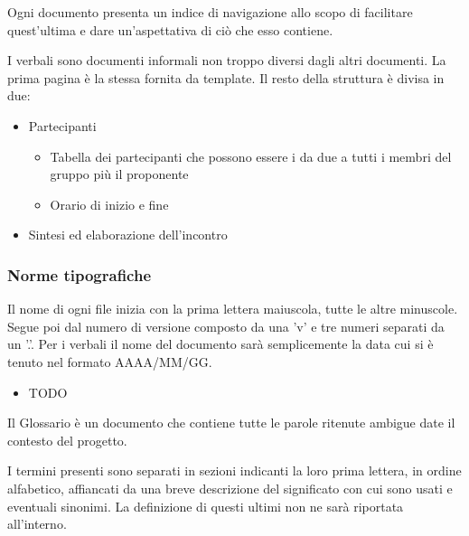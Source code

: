         Ogni documento presenta un indice di navigazione allo scopo di facilitare quest'ultima e
        dare un'aspettativa di ciò che esso contiene.


        I verbali sono documenti informali non troppo diversi dagli altri documenti.
        La prima pagina è la stessa fornita da template.
        Il resto della struttura è divisa in due:
        \begin{itemize}
          \item Partecipanti
          \begin{itemize}
            \item Tabella dei partecipanti che possono essere i da due a tutti i membri del gruppo più il proponente
            \item Orario di inizio e fine
          \end{itemize}
          \item Sintesi ed elaborazione dell'incontro
        \end{itemize}

\subsubsection{Norme tipografiche}

    Il nome di ogni file inizia con la prima lettera maiuscola, tutte le altre minuscole.
    Segue poi dal numero di versione composto da una 'v' e tre numeri separati da un '.'.
    Per i verbali il nome del documento sarà semplicemente la data cui si è tenuto nel formato
    AAAA/MM/GG.

    \begin{itemize}
    \item TODO
    \end{itemize}

    Il Glossario è un documento che contiene tutte le parole ritenute ambigue date il contesto del progetto.

    I termini presenti sono separati in sezioni indicanti la loro prima lettera, in ordine alfabetico, affiancati
    da una breve descrizione del significato con cui sono usati e eventuali sinonimi.
    La definizione di questi ultimi non ne sarà riportata all'interno.

